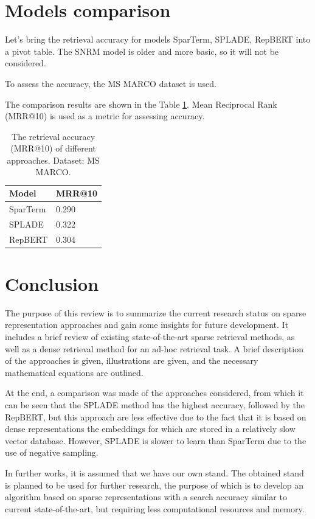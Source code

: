 \documentclass[
    twocolumn,
]{ceurart}
\begin{document}
    \section{Models comparison}

    Let's bring the retrieval accuracy for models SparTerm, SPLADE, RepBERT into a pivot table.
    The SNRM model is older and more basic, so it will not be considered.

    To assess the accuracy, the MS MARCO dataset\cite{MS-MARCO} is used.

    The comparison results are shown in the Table \ref{tab:evaluation}.
    Mean Reciprocal Rank (MRR@10) is used as a metric for assessing accuracy.

    \begin{table}[h]
        \caption{The retrieval accuracy (MRR@10) of different approaches. Dataset: MS MARCO.}
        \label{tab:evaluation}
        \begin{tabular}{p{}|p{}}
            \toprule
            Model                   & MRR@10 \\
            \midrule
            SparTerm\cite{SparTerm} & 0.290  \\
            SPLADE\cite{SPLADE}     & 0.322  \\
            RepBERT\cite{RepBERT}   & 0.304  \\
            \bottomrule
        \end{tabular}
    \end{table}


    \section{Conclusion}

    The purpose of this review is to summarize the current research status on sparse representation
    approaches and gain some insights for future development.
    It includes a brief review of existing state-of-the-art sparse retrieval methods, as well as a
    dense retrieval method for an ad-hoc retrieval task.
    A brief description of the approaches is given, illustrations are given, and the necessary
    mathematical equations are outlined.

    At the end, a comparison was made of the approaches considered, from which it can be seen that
    the SPLADE method has the highest accuracy, followed by the RepBERT, but this
    approach are less effective due to the fact that it is based on dense representations the
    embeddings for which are stored in a relatively slow vector database.
    However, SPLADE is slower to learn than SparTerm due to the use of negative sampling.

    In further works, it is assumed that we have our own stand.
    The obtained stand is planned to be used for further research, the purpose of which is to
    develop an algorithm based on sparse representations with a search accuracy similar to
    current state-of-the-art, but requiring less computational resources and memory.

    

    \appendix
\end{document}
